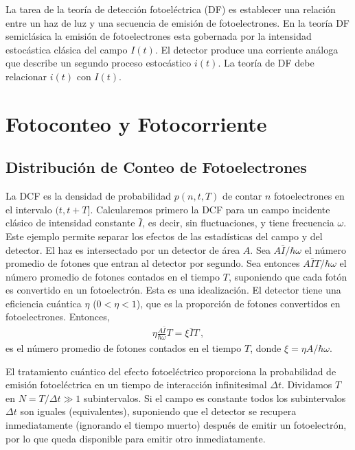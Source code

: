 \documentclass[twocolumn,aps,eqsecnum,showkeys,amsmath]{revtex4}
\begin{document}
La tarea de la teor\'ia de detecci\'on fotoel\'ectrica (DF) es establecer 
una relaci\'on entre un haz de luz y una secuencia de emisi\'on de 
fotoelectrones. En la teor\'ia DF semicl\'asica la emisi\'on de 
fotoelectrones esta gobernada por la intensidad estoc\'astica cl\'asica 
del campo $I(t)$. El detector produce una corriente an\'aloga que 
describe un segundo proceso estoc\'astico $i(t)$. La teor\'ia de DF 
debe relacionar $i(t)$ con $I(t)$. 

\section{Fotoconteo y Fotocorriente}

\subsection{Distribuci\'on de Conteo de Fotoelectrones} %
La DCF es la densidad de probabilidad $p(n,t,T)$ de contar $n$ 
fotoelectrones en el intervalo $(t,t+T]$. Calcularemos primero la DCF 
para un campo incidente cl\'asico de intensidad constante $\bar{I}$, es 
decir, sin fluctuaciones, y tiene frecuencia $\omega$. Este ejemplo 
permite separar los efectos de las estad\'isticas del campo y del detector. 
El haz es intersectado por un detector de \'area $A$. Sea 
$A \bar{I}/\hbar \omega$ el n\'umero promedio de fotones que entran 
al detector por segundo. Sea entonces $A \bar{I} T/\hbar \omega$ el 
n\'umero promedio de fotones contados en el tiempo $T$, suponiendo 
que cada fot\'on es convertido en un fotoelectr\'on. Esta es una 
idealizaci\'on. El detector tiene una eficiencia cu\'antica $\eta$ 
($0< \eta <1$), que es la proporci\'on de fotones convertidos en 
fotoelectrones. Entonces, 
%
\begin{eqnarray}
\eta \frac{A \bar{I}}{\hbar \omega} T =\xi \bar{I} T \,, 
\end{eqnarray}
es el n\'umero promedio de fotones contados en el tiempo $T$, donde 
$\xi =\eta A/\hbar \omega$.  

El tratamiento cu\'antico del efecto fotoel\'ectrico proporciona la 
probabilidad de emisi\'on fotoel\'ectrica en un tiempo de interacci\'on 
infinitesimal $\Delta t$. Dividamos $T$ en $N=T/\Delta t \gg 1$ 
subintervalos. Si el campo es constante todos los subintervalos 
$\Delta t$ son iguales (equivalentes), suponiendo que el detector 
se recupera inmediatamente (ignorando el tiempo muerto) despu\'es 
de emitir un fotoelectr\'on, por lo que queda disponible para emitir otro 
inmediatamente. 
\end{document}
